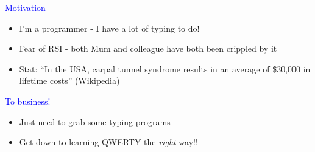 \documentclass[landscape]{slides}
\begin{document}
\begin{slide}

    \textcolor{blue}{\Large{Motivation}}

    \begin{itemize}
        \item I'm a programmer - I have a lot of typing to do!
        \item Fear of RSI - both Mum and colleague have both been crippled by it
        \item Stat: ``In the USA, carpal tunnel syndrome results in an average of \$30,000 in lifetime costs'' (Wikipedia)
    \end{itemize}

\end{slide}


\begin{slide}

    \textcolor{blue}{\Large{To business!}}

    \begin{itemize}
        \item Just need to grab some typing programs
        \item Get down to learning QWERTY the \emph{right} way!!
    \end{itemize}

\end{slide}
\end{document}
